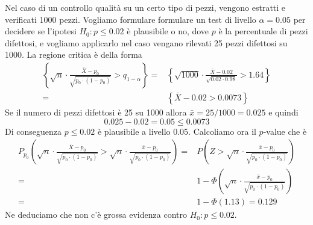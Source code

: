 \begin{example}
	Nel caso di un controllo qualità su un certo tipo di pezzi, vengono estratti e verificati 1000
	pezzi. Vogliamo formulare formulare un test di livello $\alpha = 0.05$ per decidere se
	l'ipotesi $H_0 : p \leq 0.02$ è plausibile o no, dove $p$ è la percentuale di pezzi difettosi,
	e vogliamo applicarlo nel caso vengano rilevati 25 pezzi difettosi su 1000. La regione critica
	è della forma
	\begin{align*}
		\left\{ \sqrt{n} \cdot \frac{\bar{X} - p_0}{\sqrt{p_0 \cdot (1-p_0)}}
		> q_{1-\alpha} \right\} = &
		\left\{ \sqrt{1000} \cdot \frac{\bar{X} - 0.02}{\sqrt{0.02 \cdot 0.98}} > 1.64 \right\} \\
		=                         & \left\{ \bar{X} - 0.02 > 0.0073 \right\}
	\end{align*}
	Se il numero di pezzi difettosi è 25 su 1000 allora $\bar{x} = 25 / 1000 = 0.025$ e quindi
	\[ 0.025 - 0.02 = 0.05 \leq 0.0073 \]
	Di conseguenza $p \leq 0.02$ è plausibile a livello 0.05. Calcoliamo ora il $p$-value che è
	\begin{align*}
		P_{p_0} \left( \sqrt{n} \cdot \frac{\bar{X} - p_0}{\sqrt{p_0 \cdot (1-p_0)}} >
		\sqrt{n} \cdot \frac{\bar{x} - p_0}{\sqrt{p_0 \cdot (1-p_0)}} \right) = &
		P \left( Z > \sqrt{n} \cdot \frac{\bar{x} - p_0}{\sqrt{p_0 \cdot (1-p_0)}} \right)    \\
		=                                                                       &
		1 - \Phi \left( \sqrt{n} \cdot \frac{\bar{x} - p_0}{\sqrt{p_0 \cdot (1-p_0)}} \right) \\
		=                                                                       &
		1 - \Phi(1.13) = 0.129
	\end{align*}
	Ne deduciamo che non c'è grossa evidenza contro $H_0 : p \leq 0.02$.
\end{example}
